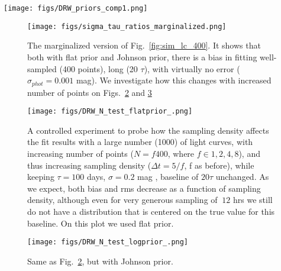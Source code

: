 \documentclass[fleqn,usenatbib]{mnras}  %
\begin{document}

\begin{figure*}
\texttt{[image: figs/DRW\_priors\_comp1.png]}
\caption{We plot results of fitting the simulated light curves with Celerite Real Term kernel, with flat (left), or Johnson prior (right). The cross shows the location of truth.  Both are offset, and Fig.~\ref{fig:sim_lc_400_marg} shows the marginalized version of that plot. We repeat the same experiment,  increasing the number of points tenfold to show the behavior of the bias. }
\label{fig:sim_lc_400}
\end{figure*} 


\begin{figure}
\texttt{[image: figs/sigma\_tau\_ratios\_marginalized.png]}
\caption{The marginalized version of Fig.~\ref{fig:sim_lc_400}. It shows that both with flat prior and Johnson prior,  there is a bias in fitting well-sampled (400 points), long (20 $\tau$), with virtually no error ($\sigma_{phot}=0.001 $ mag). We investigate how this changes with increased number of points on Figs.~\ref{fig:sim_lc_N_pts_flat} and \ref{fig:sim_lc_N_pts_log}}
\label{fig:sim_lc_400_marg}
\end{figure}


\begin{figure}
\texttt{[image: figs/DRW\_N\_test\_flatprior\_.png]}
\caption{A controlled experiment to probe how the sampling density affects the fit results with a large number (1000) of light curves, with increasing number of points ($N = f 400$, where $f \in {1,2,4,8}$), and thus increasing sampling density ($\Delta t = 5 /f $, f as before), while keeping  $\tau=100$ days, $\sigma=0.2$ mag  , baseline of $20 \tau$ unchanged. As we expect, both bias and rms decrease as a function of sampling density, although even for very generous sampling of $~12$ hrs we still do not have a distribution that is centered on the true value for this baseline. On this plot we used flat prior. }
\label{fig:sim_lc_N_pts_flat}
\end{figure}


\begin{figure}
\texttt{[image: figs/DRW\_N\_test\_logprior\_.png]}
\caption{Same as Fig.~\ref{fig:sim_lc_N_pts_flat}, but with Johnson prior.}
\label{fig:sim_lc_N_pts_log}
\end{figure}
\end{document}
